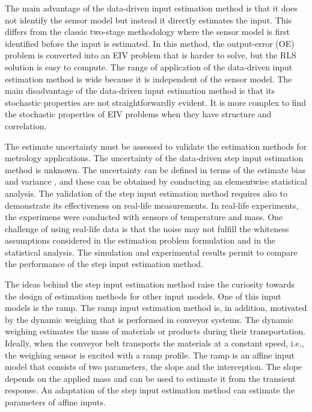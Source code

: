 The main advantage of the data-driven input estimation method is that it does not identify the sensor model but instead it directly estimates the input. 
This differs from the classic two-stage methodology where the sensor model is first identified before the input is estimated.
In this method, the output-error (OE) problem is converted into an EIV problem that is harder to solve, but the RLS solution is easy to compute.
The range of application of the data-driven input estimation method is wide because it is independent of the sensor model.
The main disadvantage of the data-driven input estimation method is that its stochastic properties are not straightforwardly evident. 
It is more complex to find the stochastic properties of EIV problems when they have structure and correlation.


The estimate uncertainty must be assessed to validate the estimation methods for metrology applications.
The uncertainty of the data-driven step input estimation method \cite{Markovsky15cep} is unknown.
The uncertainty can be defined in terms of the estimate bias and variance \cite{Pintelon12Book}, and these can be obtained by conducting an elementwise statistical analysis.
The validation of the step input estimation method requires also to demonstrate its effectiveness on real-life measurements.
In real-life experiments, the experimens were conducted with sensors of temperature and mass.
One challenge of using real-life data is that the noise may not fulfill the whiteness assumptions considered in the estimation problem formulation and in the statistical analysis.
The simulation and experimental results permit to compare the performance of the step input estimation method.

The ideas behind the step input estimation method raise the curiosity towards the design of estimation methods for other input models.
One of this input models is the ramp.
The ramp input estimation method is, in addition, motivated by the dynamic weighing that is performed in conveyor systems.
The dynamic weighing estimates the mass of materials or products during their transportation.
Ideally, when the conveyor belt transports the materials at a constant speed, i.e., the weighing sensor is excited with a ramp profile. 
The ramp is an affine input model that consists of two parameters, the slope and the interception.
The slope depends on the applied mass and can be used to estimate it from the transient response.
An adaptation of the step input estimation method can estimate the parameters of affine inputs.

